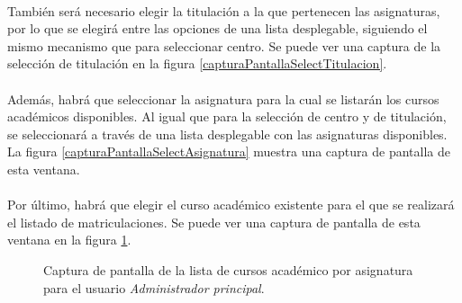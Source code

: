   \paragraph{}También será necesario elegir la titulación a la que pertenecen
  las asignaturas, por lo que se elegirá entre las opciones de una lista
  desplegable, siguiendo el mismo mecanismo que para seleccionar centro. Se
  puede ver una captura de la selección de titulación en la figura
  \ref{capturaPantallaSelectTitulacion}.

  \paragraph{}Además, habrá que seleccionar la asignatura para la cual se
  listarán los cursos académicos disponibles. Al igual que para la selección de
  centro y de titulación, se seleccionará a través de una lista desplegable con
  las asignaturas disponibles. La figura \ref{capturaPantallaSelectAsignatura}
  muestra una captura de pantalla de esta ventana.

  \paragraph{}Por último, habrá que elegir el curso académico existente para el
  que se realizará el listado de matriculaciones. Se puede ver una captura de
  pantalla de esta ventana en la figura
  \ref{capturaPantallaSelectCursoAcademicoAsignatura}.

  \begin{figure}[!ht]
    \begin{center}
      \caption{Captura de pantalla de la lista de cursos académico por asignatura para el usuario \textit{Administrador principal}.}
      \label{capturaPantallaSelectCursoAcademicoAsignatura}
    \end{center}
  \end{figure}

